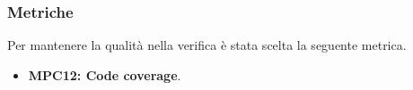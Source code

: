 \subsubsection{Metriche}
Per mantenere la qualità nella verifica è stata scelta la seguente metrica.
\begin{itemize}
    \item \textbf{MPC12: Code coverage}.
\end{itemize}